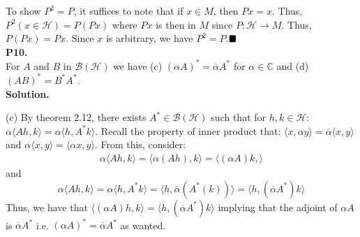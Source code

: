 \documentclass{article}
\begin{document}
    To show $P^2 = P$, it suffices to note that if $x\in M$, then $Px = x$. Thus, $P^2(x\in \mathcal{H}) = P(Px)$ where $Px$ is then
    in $M$ since $P:\mathcal{H}\to M$. Thus, $P(Px) = Px$. Since $x$ is arbitrary, we have $P^2 = P$.$\hfill\blacksquare$\\

    \textbf{P10.}\\

     For $A$ and $B$ in $\mathcal{B}(\mathcal{H})$ we have (c) $(\alpha A)^* = \overline{\alpha}A^*$ for $\alpha\in\mathbb{C}$ and
     (d) $(AB)^* = B^* A^*$.\\

     \textbf{Solution.}

     (c) By theorem 2.12, there exists $A^*\in\mathcal{B}(\mathcal{H})$ such that for $h,k\in\mathcal{H}$:
     $\alpha\langle Ah,k\rangle = \alpha\langle h,A^* k\rangle$. Recall the property of inner product that:
     $\langle x,\alpha y\rangle = \overline{\alpha}\langle x,y\rangle$ and $\alpha\langle x,y\rangle =\langle\alpha x,y\rangle$.
     From this, consider:
     \begin{align*}
         \alpha\langle Ah,k\rangle = \langle \alpha(Ah),k\rangle = \langle (\alpha A)k,\rangle
     \end{align*}
     and
     \[ \alpha\langle Ah,k\rangle = \alpha\langle h,A^* k\rangle = \langle h,\overline{\alpha}(A^*(k))\rangle
         = \langle h,(\overline{\alpha} A^*)k\rangle \]
     Thus, we have that $\langle (\alpha A)h,k\rangle = \langle h,(\overline{\alpha}A^*)k\rangle$ implying that the adjoint
     of $\alpha A$ is $\overline{\alpha} A^*$ i.e. $(\alpha A)^* = \overline{\alpha} A^*$ as wanted.

     \newpage
\end{document}
